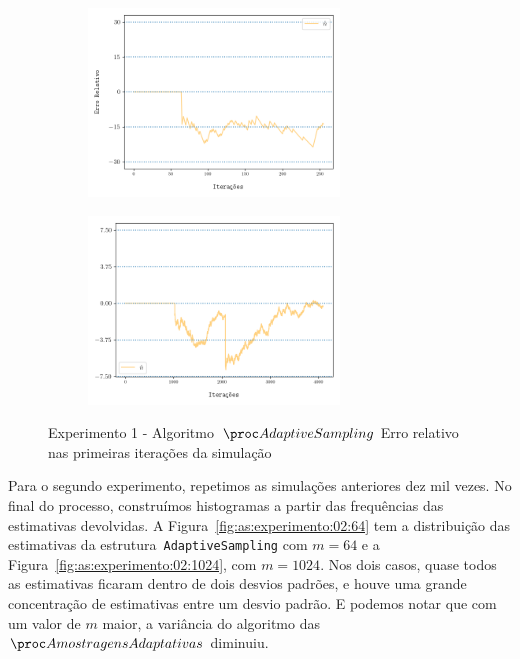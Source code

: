 \begin{figure}
  \centering
  \captionsetup{justification=centering,margin=2cm}
  \begin{subfigure}{.5\textwidth}
    \centering
    \includegraphics[width=\linewidth, height=5cm]{figuras/adaptive_sampling_erro_first_64.png}
  \end{subfigure}%
  \begin{subfigure}{.5\textwidth}
    \centering
    \includegraphics[width=\linewidth, height=5cm]{figuras/adaptive_sampling_erro_first_1024.png}
  \end{subfigure}
  \caption{Experimento 1 - Algoritmo~$\AS$ \linebreak Erro relativo nas primeiras iterações da simulação}
  \label{fig:as:experimento:01:erro:first}
\end{figure}

Para o segundo experimento, repetimos as simulações anteriores dez mil vezes. No final do processo, construímos 
histogramas a partir das frequências das estimativas devolvidas. A Figura~\ref{fig:as:experimento:02:64} tem a 
distribuição das estimativas da estrutura~\texttt{AdaptiveSampling} com $m = 64$ e a 
Figura~\ref{fig:as:experimento:02:1024}, com $m = 1024$. Nos dois casos, quase todos as estimativas ficaram dentro de
dois desvios padrões, e houve uma grande concentração de estimativas entre um desvio padrão. E podemos notar que com um
valor de $m$ maior, a variância do algoritmo das $\asampling$ diminuiu.

